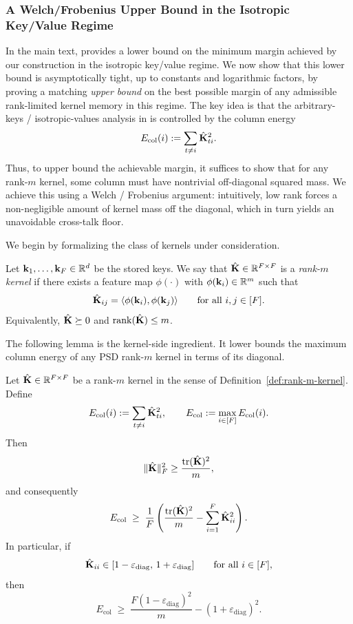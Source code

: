 
\subsubsection{A Welch/Frobenius Upper Bound in the Isotropic Key/Value Regime}
\label{app:theory:margin_bounds:rkrv:welch}
\label{app:welch-upper-bound-iso}

In the main text,  provides a lower bound on the minimum margin achieved by our construction in the isotropic key/value regime.
We now show that this lower bound is asymptotically tight, up to constants and logarithmic factors, by proving a matching \emph{upper bound} on the best possible margin of any admissible rank-limited kernel memory in this regime. The key idea is that the arbitrary-keys / isotropic-values analysis in  is controlled by the column energy
\[
E_{\mathrm{col}}(i) := \sum_{t\neq i} \hat{\mathbf{K}}_{ti}^2.
\]
Thus, to upper bound the achievable margin, it suffices to show that for any rank-$m$ kernel, some column must have nontrivial off-diagonal squared mass.
We achieve this using a Welch / Frobenius argument: intuitively, low rank forces a non-negligible amount of kernel mass off the diagonal, which in turn yields an unavoidable cross-talk floor.

We begin by formalizing the class of kernels under consideration.

\begin{definition}
\label{def:rank-m-kernel}
Let ${\mathbf{k}}_{1},\dots,{\mathbf{k}}_{F} \in \mathbb{R}^d$ be the stored keys. We say that
$\hat{\mathbf{K}} \in \mathbb{R}^{F\times F}$ is a \emph{rank-$m$ kernel} if there exists a feature
map $\phi(\cdot)$ with $\phi({\mathbf{k}}_{i})\in\mathbb{R}^m$ such that
\[
\hat{\mathbf{K}}_{ij} = \langle \phi({\mathbf{k}}_{i}), \phi({\mathbf{k}}_{j})\rangle
\qquad\text{for all } i,j\in[F].
\]
Equivalently, $\hat{\mathbf{K}} \succeq 0$ and $\operatorname{rank}(\hat{\mathbf{K}})\le m$.
\end{definition}

The following lemma is the kernel-side ingredient. It lower bounds the maximum column energy
of any PSD rank-$m$ kernel in terms of its diagonal.

\begin{lemma}
\label{lem:welch-frobenius-general}
Let $\hat{\mathbf{K}} \in \mathbb{R}^{F\times F}$ be a rank-$m$ kernel in the sense of
Definition~\ref{def:rank-m-kernel}. Define
\[
E_{\mathrm{col}}(i) := \sum_{t\neq i}\hat{\mathbf{K}}_{ti}^2,
\qquad
E_{\mathrm{col}} := \max_{i\in[F]} E_{\mathrm{col}}(i).
\]
Then
\[
\|\hat{\mathbf{K}}\|_{F}^2 \ge \frac{\operatorname{tr}(\hat{\mathbf{K}})^2}{m},
\]
and consequently
\[
E_{\mathrm{col}}
\;\ge\;
\frac{1}{F}\left(
\frac{\operatorname{tr}(\hat{\mathbf{K}})^2}{m}
-
\sum_{i=1}^F \hat{\mathbf{K}}_{ii}^2
\right).
\]
In particular, if
\[
\hat{\mathbf{K}}_{ii}\in[1-\varepsilon_{\mathrm{diag}},\,1+\varepsilon_{\mathrm{diag}}]
\qquad\text{for all } i\in[F],
\]
then
\[
E_{\mathrm{col}}
\;\ge\;
\frac{F(1-\varepsilon_{\mathrm{diag}})^2}{m}
-
(1+\varepsilon_{\mathrm{diag}})^2.
\]
\end{lemma}


